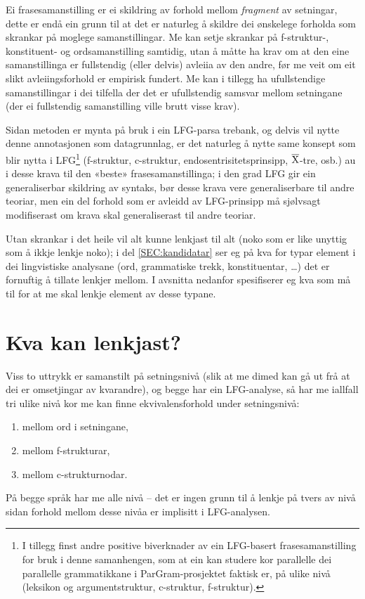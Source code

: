 \documentclass[12pt,a4paper,oneside,draft]{report}
\newcommand{\xbar}{$\rm\overline{X}$}
\begin{document}
Ei frasesamanstilling er ei skildring av forhold mellom \emph{fragment} av
setningar, dette er endå ein grunn til at det er naturleg å skildre
dei ønskelege forholda som skrankar på moglege samanstillingar. Me kan
setje skrankar på f\hyp{}struktur-, konstituent- og ordsamanstilling
samtidig, utan å måtte ha krav om at den eine samanstillinga er
fullstendig (eller delvis) avleiia av den andre, før me veit om eit
slikt avleiingsforhold er empirisk fundert. Me kan i tillegg ha
ufullstendige samanstillingar i dei tilfella der det er ufullstendig
samsvar mellom setningane (der ei fullstendig samanstilling ville
brutt visse krav).

Sidan metoden er mynta på bruk i ein LFG-parsa trebank, og delvis vil
nytte denne annotasjonen som datagrunnlag, er det naturleg å nytte
same konsept som blir nytta i LFG\footnote{I tillegg finst andre positive biverknader av ein LFG-basert
       frasesamanstilling for bruk i denne samanhengen, som at ein kan
       studere kor parallelle dei parallelle grammatikkane i
       ParGram-prosjektet \citep{butt2002pgp} faktisk er, på ulike
       nivå (leksikon og argumentstruktur, c\hyp{}struktur, f\hyp{}struktur). } (f\hyp{}struktur, c\hyp{}struktur,
endosentrisitetsprinsipp, \xbar{}-tre, osb.)  au i desse krava til den
«beste» frasesamanstillinga; i den grad LFG gir ein generaliserbar
skildring av syntaks, bør desse krava vere generaliserbare til andre
teoriar, men ein del forhold som er avleidd av LFG-prinsipp må
sjølvsagt modifiserast om krava skal generaliserast til andre teoriar.

Utan skrankar i det heile vil alt kunne lenkjast til alt (noko som er
like unyttig som å ikkje lenkje noko); i del \ref{SEC:kandidatar} ser
eg på kva for typar element i dei lingvistiske analysane (ord,
grammatiske trekk, konstituentar, \ldots{}) det er fornuftig å tillate
lenkjer mellom. I avsnitta nedanfor spesifiserer eg kva som må til for
at me skal lenkje element av desse typane.

\section{Kva kan lenkjast?}
\label{sec-3.4}

\label{SEC:kandidatar}

Viss to uttrykk er samanstilt på setningsnivå (slik at me dimed kan gå
ut frå at dei er omsetjingar av kvarandre), og begge har ein
LFG-analyse, så har me iallfall tri ulike nivå kor me kan finne
ekvivalensforhold under setningsnivå:
\begin{enumerate}
\item mellom ord i setningane,
\item mellom f\hyp{}strukturar,
\item mellom c\hyp{}strukturnodar.
\end{enumerate}
På begge språk har me alle nivå -- det er ingen grunn til å lenkje på
tvers av nivå sidan forhold mellom desse nivåa er implisitt i
LFG-analysen.
\end{document}
